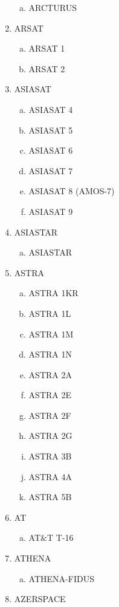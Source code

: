 \begin{multicols}{2}
\begin{enumerate}
  \begin{enumerate}[a.]
    \item ARCTURUS
  \end{enumerate}
  \item ARSAT
  \begin{enumerate}[a.]
    \item ARSAT 1
    \item ARSAT 2
  \end{enumerate}
  \item ASIASAT
  \begin{enumerate}[a.]
    \item ASIASAT 4
    \item ASIASAT 5
    \item ASIASAT 6
    \item ASIASAT 7
    \item ASIASAT 8 (AMOS-7)
    \item ASIASAT 9
  \end{enumerate}
  \item ASIASTAR
  \begin{enumerate}[a.]
    \item ASIASTAR
  \end{enumerate}
  \item ASTRA
  \begin{enumerate}[a.]
    \item ASTRA 1KR
    \item ASTRA 1L
    \item ASTRA 1M
    \item ASTRA 1N
    \item ASTRA 2A
    \item ASTRA 2E
    \item ASTRA 2F
    \item ASTRA 2G
    \item ASTRA 3B
    \item ASTRA 4A
    \item ASTRA 5B
  \end{enumerate}
  \item AT
  \begin{enumerate}[a.]
    \item AT\&T T-16
  \end{enumerate}
  \item ATHENA
  \begin{enumerate}[a.]
    \item ATHENA-FIDUS
  \end{enumerate}
  \item AZERSPACE

\end{enumerate}
\end{multicols}
